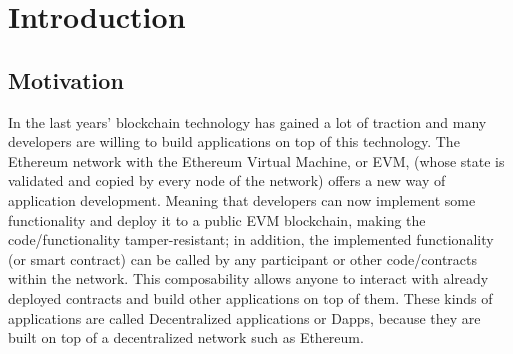 \documentclass[11pt,a4paper]{report}
\begin{document}

\begin{abstract} 
\LaTeX\ bietet Buchdruckqualität für jedermann.
Wir zeigen anhand dieses durch persönliche Präferenzen geprägtes Template, 
wie man Buchdruckqualität für eine Abschlussarbeit einfach erreichen kann.
Dazu werden beispielhaft Lösungen zu üblichen Fragestellungen im Dokument 
vorgestellt.
Zunächst benötigt man ein passendes \LaTeX\ System mit einigen 
installierten Erweiterungspaketen, das es erlaubt das Template zu 
übersetzen. 
Neben den grundlegenden For\-ma\-tie\-rungs\-möglich\-keiten mit \LaTeX\ wird 
insbesondere das Erstellen und Einbinden von Grafiken, Listings und 
mathematischen Formeln gezeigt.
Des Weiteren werden Literatur- und andere Verzeichnisse eingebunden.
Nicht zuletzt finden sich auch sachdienliche Hinweise zum
Schreiben und Zitieren von Literatur.
\end{abstract}

\tableofcontents
\newpage 

\chapter{Introduction} \label{ch:intro}



\section{Motivation}
In the last years' blockchain technology has gained a lot of traction and many developers are willing to build applications on top of this technology.
The Ethereum network with the Ethereum Virtual Machine, or EVM\cite{evm}, (whose state is validated and copied by every node of the network) offers a new way of application development. Meaning that developers can now implement some functionality and deploy it to a public EVM blockchain, making the code/functionality tamper-resistant; in addition, the implemented functionality (or smart contract) can be called by any participant or other code/contracts within the network. This composability allows anyone to interact with already deployed contracts and build other applications on top of them. 
These kinds of applications are called Decentralized applications or Dapps\cite{dapps}, because they are built on top of a decentralized network such as  Ethereum.
\end{document}
